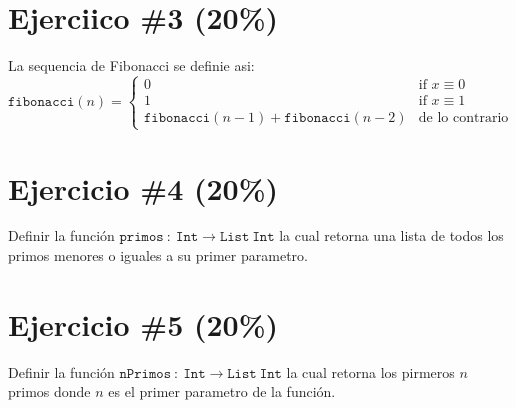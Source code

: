 \documentclass{article}
\begin{document}
\section*{Ejerciico \#3 (20\%)}
La sequencia de Fibonacci se definie asi:
\[
        \mathtt{fibonacci}(n) =
        \left\{
                \begin{array}{ll}
                        0  & \mbox{if } x \equiv 0 \\
                        1 & \mbox{if } x \equiv 1 \\
                        \mathtt{fibonacci}(n-1)+\mathtt{fibonacci}(n-2) & \mbox{de lo contrario}

                \end{array}
        \right.\]

\section*{Ejercicio \#4 (20\%)}
Definir la funci\'on $\mathtt{primos}\ :\ \mathtt{Int}\rightarrow \mathtt{List\ Int}$
la cual retorna una lista de todos los primos menores o iguales a su primer
parametro.

\section*{Ejercicio \#5 (20\%)}
Definir la funci\'on $\mathtt{nPrimos}\ :\ \mathtt{Int}\rightarrow \mathtt{List\ Int}$
la cual retorna los pirmeros $n$ primos donde $n$ es el primer parametro de la funci\'on.

% 
% 
\end{document}
